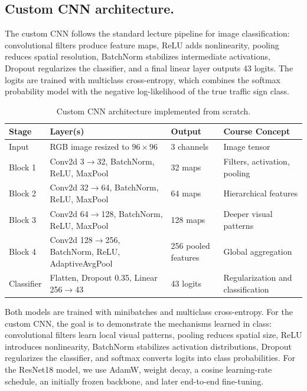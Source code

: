 \documentclass[12pt,letterpaper]{article}
\begin{document}
\subsection*{Custom CNN architecture.}
The custom CNN follows the standard lecture pipeline for image classification: convolutional filters produce feature maps, ReLU adds nonlinearity, pooling reduces spatial resolution, BatchNorm stabilizes intermediate activations, Dropout regularizes the classifier, and a final linear layer outputs 43 logits. The logits are trained with multiclass cross-entropy, which combines the softmax probability model with the negative log-likelihood of the true traffic sign class.

\begin{table}[H]
\centering
\caption{Custom CNN architecture implemented from scratch.}
\footnotesize
\begin{tabular}{p{0.75in}p{2.45in}p{0.95in}p{1.55in}}
\toprule
Stage & Layer(s) & Output & Course Concept \\
\midrule
Input & RGB image resized to $96 \times 96$ & 3 channels & Image tensor \\
Block 1 & Conv2d 3$\rightarrow$32, BatchNorm, ReLU, MaxPool & 32 maps & Filters, activation, pooling \\
Block 2 & Conv2d 32$\rightarrow$64, BatchNorm, ReLU, MaxPool & 64 maps & Hierarchical features \\
Block 3 & Conv2d 64$\rightarrow$128, BatchNorm, ReLU, MaxPool & 128 maps & Deeper visual patterns \\
Block 4 & Conv2d 128$\rightarrow$256, BatchNorm, ReLU, AdaptiveAvgPool & 256 pooled features & Global aggregation \\
Classifier & Flatten, Dropout 0.35, Linear 256$\rightarrow$43 & 43 logits & Regularization and classification \\
\bottomrule
\end{tabular}
\end{table}

Both models are trained with minibatches and multiclass cross-entropy. For the custom CNN, the goal is to demonstrate the mechanisms learned in class: convolutional filters learn local visual patterns, pooling reduces spatial size, ReLU introduces nonlinearity, BatchNorm stabilizes activation distributions, Dropout regularizes the classifier, and softmax converts logits into class probabilities. For the ResNet18 model, we use AdamW, weight decay, a cosine learning-rate schedule, an initially frozen backbone, and later end-to-end fine-tuning.
\end{document}
